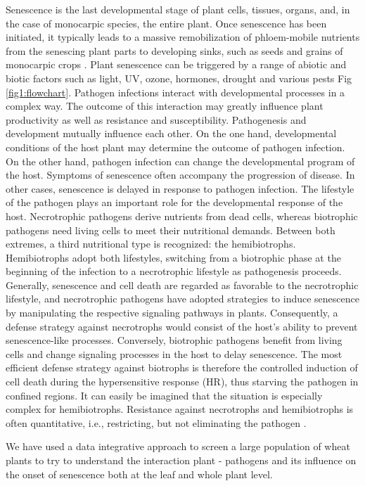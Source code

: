 \documentclass{frontiersSCNS} %
\begin{document}
Senescence is the last developmental stage of plant cells, tissues, organs, and, in the case of monocarpic species, the entire plant. Once senescence has been initiated, it typically leads to a massive remobilization of phloem-mobile nutrients from the senescing plant parts to developing sinks, such as seeds and grains of monocarpic crops \cite{Distelfeld27012014}. Plant senescence can be triggered by a range of abiotic and biotic factors such as light, UV, ozone, hormones, drought and various pests \cite{PLB:PLB114} Fig \ref{fig1:flowchart}. Pathogen infections interact with developmental processes in a complex way. The outcome of this interaction may greatly influence plant productivity as well as resistance and susceptibility. Pathogenesis and development mutually influence each other. On the one hand, developmental conditions of the host plant may determine the outcome of pathogen infection. On the other hand, pathogen infection can change the developmental program of the host. Symptoms of senescence often accompany the progression of disease. In other cases, senescence is delayed in response to pathogen infection. The lifestyle of the pathogen plays an important role for the developmental response of the host. Necrotrophic pathogens derive nutrients from dead cells, whereas biotrophic pathogens need living cells to meet their nutritional demands. Between both extremes, a third nutritional type is recognized: the hemibiotrophs. Hemibiotrophs adopt both lifestyles, switching from a biotrophic phase at the beginning of the infection to a necrotrophic lifestyle as pathogenesis proceeds. Generally, senescence and cell death are regarded as favorable to the necrotrophic lifestyle, and necrotrophic pathogens have adopted strategies to induce senescence by manipulating the respective signaling pathways in plants. Consequently, a defense strategy against necrotrophs would consist of the host’s ability to prevent senescence-like processes. Conversely, biotrophic pathogens benefit from living cells and change signaling processes in the host to delay senescence. The most efficient defense strategy against biotrophs is therefore the controlled induction of cell death during the hypersensitive response (HR), thus starving the pathogen in confined regions. It can easily be imagined that the situation is especially complex for hemibiotrophs. Resistance against necrotrophs and hemibiotrophs is often quantitative, i.e., restricting, but not eliminating the pathogen \cite{plants4030449}.

We have used a data integrative approach to screen a large population of wheat plants to try to understand the interaction plant - pathogens and its influence on the onset of senescence both at the leaf and whole plant level. 
\end{document}
